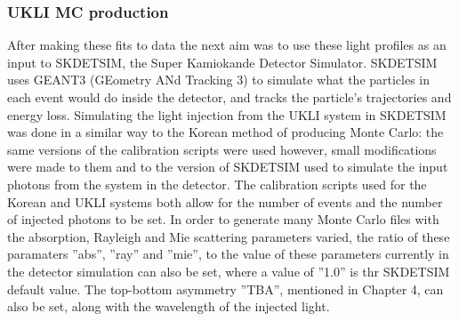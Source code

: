 \begin{figure}[!htbp]
    
\end{figure}


\subsubsection{UKLI MC production}
After making these fits to data the next aim was to use these light profiles as an input to SKDETSIM, the Super Kamiokande Detector Simulator. SKDETSIM uses GEANT3 (GEometry ANd Tracking 3) to simulate what the particles in each event would do inside the detector, and tracks the particle's trajectories and energy loss. Simulating the light injection from the UKLI system in SKDETSIM was done in a similar way to the Korean method of producing Monte Carlo: the same versions of the calibration scripts were used however, small modifications were made to them and to the version of SKDETSIM used to simulate the input photons from the system in the detector. The calibration scripts used for the Korean and UKLI systems both allow for the number of events and the number of injected photons to be set. In order to generate many Monte Carlo files with the absorption, Rayleigh and Mie scattering parameters varied, the ratio of these paramaters ''abs'', ''ray'' and ''mie'', to the value of these parameters currently in the detector simulation can also be set, where a value of ''1.0'' is thr SKDETSIM default value. The top-bottom asymmetry ''TBA'', mentioned in Chapter 4, can also be set, along with the wavelength of the injected light.
\newline
